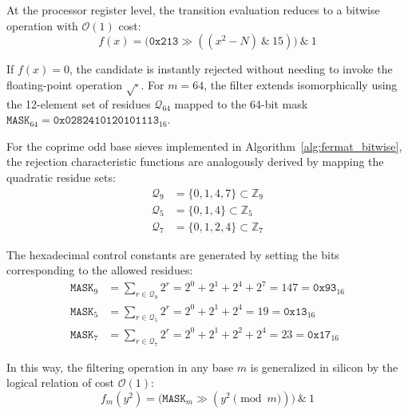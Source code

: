 \documentclass[12pt,a4paper]{article}
\theoremstyle{plain}
\begin{document}
At the processor register level, the transition evaluation reduces
to a bitwise operation with $\mathcal{O}(1)$ cost:
\[
f(x) = \bigl( \mathtt{0x213} \gg ((x^2 - N) \ \& \ 15) \bigr) \ \& \ 1
\]

If $f(x) = 0$, the candidate is instantly rejected without needing
to invoke the floating-point operation $\sqrt{\cdot}$. For $m = 64$,
the filter extends isomorphically using the 12-element set of residues
$\mathcal{Q}_{64}$ mapped to the 64-bit mask
$\mathtt{MASK}_{64} = \mathtt{0x0282410120101113}_{16}$.

For the coprime odd base sieves implemented in
Algorithm~\ref{alg:fermat_bitwise}, the rejection characteristic functions
are analogously derived by mapping the quadratic residue sets:
\begin{align*}
\mathcal{Q}_{9} &= \{0, 1, 4, 7\} \subset \mathbb{Z}_9 \\
\mathcal{Q}_{5} &= \{0, 1, 4\} \subset \mathbb{Z}_5 \\
\mathcal{Q}_{7} &= \{0, 1, 2, 4\} \subset \mathbb{Z}_7
\end{align*}

The hexadecimal control constants are generated by setting the bits
corresponding to the allowed residues:
\begin{align*}
\mathtt{MASK}_{9}  &= \sum_{r \in \mathcal{Q}_9} 2^r
  = 2^0 + 2^1 + 2^4 + 2^7 = 147 = \mathtt{0x93}_{16} \\
\mathtt{MASK}_{5}  &= \sum_{r \in \mathcal{Q}_5} 2^r
  = 2^0 + 2^1 + 2^4 = 19 = \mathtt{0x13}_{16} \\
\mathtt{MASK}_{7}  &= \sum_{r \in \mathcal{Q}_7} 2^r
  = 2^0 + 2^1 + 2^2 + 2^4 = 23 = \mathtt{0x17}_{16}
\end{align*}

In this way, the filtering operation in any base $m$ is
generalized in silicon by the logical relation of cost $\mathcal{O}(1)$:
\[
f_m(y^2) = \bigl( \mathtt{MASK}_m \gg (y^2 \pmod m) \bigr) \ \& \ 1
\]
\end{document}
